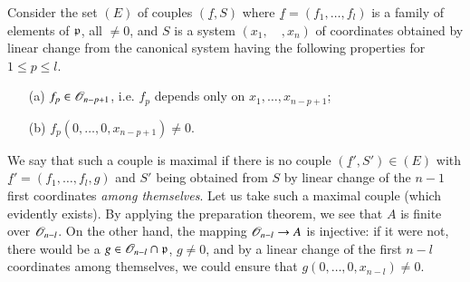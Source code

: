 Consider the set $(E)$ of couples $(\underline{f},S)$ where $\underline{f}=(f_{1},\ldots,f_{l})$ is a family of elements of $\mathfrak{p}$, all $\neq 0$, and $S$ is a system $(x_{1},\quad,x_{n})$ of coordinates obtained by linear change from the canonical system having the following properties for $1\leq p\leq l$.
\begin{itemize}
\item[(a)] $f_{p}\in \mathscr{O}_{n-p+1}$, i.e. $f_{p}$ depends only on $x_{1},\ldots,x_{n-p+1}$; 

\item[(b)] $f_{p}(0,\ldots,0,x_{n-p+1})\neq 0$.
\end{itemize}
We say that such a couple is maximal if there is no couple $(\underline{f}',S')\in (E)$ with $\underline{f}'=(f_{1},\ldots,f_{l},g)$ and $S'$ being obtained from $S$ by linear change of the $n-1$ first coordinates {\em among themselves}. Let us take such a maximal couple (which evidently exists). By applying the preparation theorem, we see that $A$ is finite over $\mathscr{O}_{n-l}$. On the other hand, the mapping $\mathscr{O}_{n-l}\to A$ is injective: if it were not, there would be a $g\in \mathscr{O}_{n-l}\cap \mathfrak{p}$, $g\neq 0$, and by a linear change of the first $n-l$ coordinates among themselves, we could ensure that $g(0,\ldots,0,x_{n-l})\neq 0$.

